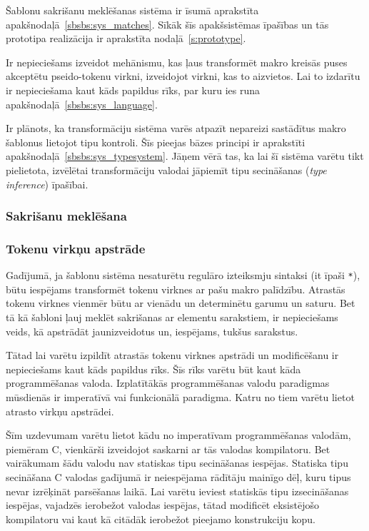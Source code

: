 Šablonu sakrišanu meklēšanas sistēma ir īsumā aprakstīta apakšnodaļā~\ref{sbsbs:sys_matches}. Sīkāk šīs apakšsistēmas īpašības un tās prototipa realizācija ir aprakstīta nodaļā~\ref{s:prototype}.

Ir nepieciešams izveidot mehānismu, kas ļaus transformēt makro kreisās puses akceptētu pseido-tokenu virkni, izveidojot virkni, kas to aizvietos. Lai to izdarītu ir nepieciešama kaut kāds papildus rīks, par kuru ies runa apakšnodaļā~\ref{sbsbs:sys_language}.

Ir plānots, ka transformāciju sistēma varēs atpazīt nepareizi sastādītus makro šablonus lietojot tipu kontroli. Šīs pieejas bāzes principi ir aprakstīti apakšnodaļā~\ref{sbsbs:sys_typesystem}. Jāņem vērā tas, ka lai šī sistēma varētu tikt pielietota, izvēlētai transformāciju valodai jāpiemīt tipu secināšanas (\emph{type inference}) īpašībai.

\subsubsection{\label{sbsbs:sys_matches}Sakrišanu meklēšana}


\subsubsection{\label{sbsbs:sys_language}Tokenu virkņu apstrāde}

Gadījumā, ja šablonu sistēma nesaturētu regulāro izteiksmju sintaksi (it īpaši \verb|*|), būtu iespējams transformēt tokenu virknes ar pašu makro palīdzību. Atrastās tokenu virknes vienmēr būtu ar vienādu un determinētu garumu un saturu. Bet tā kā šabloni ļauj meklēt sakrišanas ar elementu sarakstiem, ir nepieciešams veids, kā apstrādāt jaunizveidotus un, iespējams, tukšus sarakstus.

Tātad lai varētu izpildīt atrastās tokenu virknes apstrādi un modificēšanu ir nepieciešams kaut kāds papildus rīks. Šīs rīks varētu būt kaut kāda programmēšanas valoda. Izplatītākās programmēšanas valodu paradigmas mūsdienās ir imperatīvā  vai funkcionālā paradigma. Katru no tiem varētu lietot atrasto virkņu apstrādei.

Šīm uzdevumam varētu lietot kādu no imperatīvam programmēšanas valodām, piemēram C, vienkārši izveidojot saskarni ar tās valodas kompilatoru. Bet vairākumam šādu valodu nav statiskas tipu secināšanas iespējas. Statiska tipu secināšana C valodas gadījumā ir neiespējama rādītāju mainīgo dēļ, kuru tipus nevar izrēķināt parsēšanas laikā. Lai varētu ieviest statiskās tipu izsecināšanas iespējas, vajadzēs ierobežot valodas iespējas, tātad modificēt eksistējošo kompilatoru vai kaut kā citādāk ierobežot pieejamo konstrukciju kopu.

